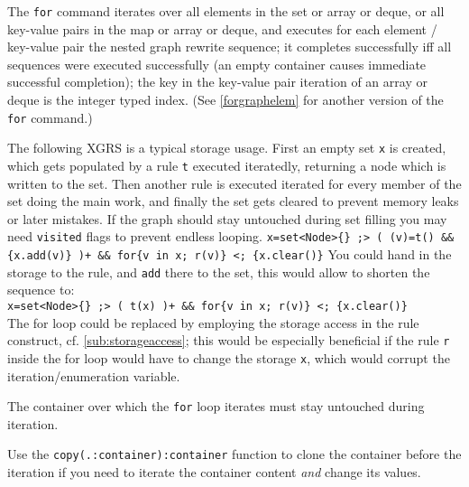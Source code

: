 The \texttt{for} command iterates over all elements in the set or array or deque, or all key-value pairs in the map or array or deque, and executes for each element / key-value pair the nested graph rewrite sequence; it completes successfully iff all sequences were executed successfully (an empty container causes immediate successful completion); the key in the key-value pair iteration of an array or deque is the integer typed index. (See \ref{forgraphelem} for another version of the \texttt{for} command.)

\begin{example}
The following XGRS is a typical storage usage.
First an empty set \texttt{x} is created, which gets populated by a rule \texttt{t} executed iteratedly, returning a node which is written to the set.
Then another rule is executed iterated for every member of the set doing the main work, and finally the set gets cleared to prevent memory leaks or later mistakes.
If the graph should stay untouched during set filling you may need \texttt{visited} flags to prevent endless looping.
\verb#x=set<Node>{} ;> ( (v)=t() && {x.add(v)} )+ && for{v in x; r(v)} <; {x.clear()}#
You could hand in the storage to the rule, and \texttt{add} there to the set, this would allow to shorten the sequence to:\\
\verb#x=set<Node>{} ;> ( t(x) )+ && for{v in x; r(v)} <; {x.clear()}#\\
The for loop could be replaced by employing the storage access in the rule construct, cf. \ref{sub:storageaccess}; this would be especially beneficial if the rule \texttt{r} inside the for loop would have to change the storage \texttt{x}, which would corrupt the iteration/enumeration variable.
\end{example}

\begin{warning}
The container over which the \texttt{for} loop iterates must stay untouched during iteration.

Use the \texttt{copy(.:container):container} function to clone the container before the iteration if you need to iterate the container content \emph{and} change its values.
\end{warning}


